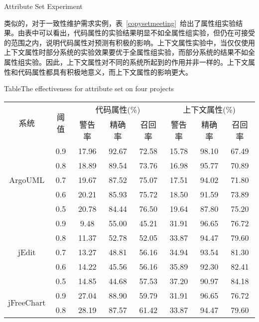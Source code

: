 {Attribute Set Experiment}

类似的，对于一致性维护需求实例，表~\ref{copysetmeeting}~给出了属性组实验结果。由表中可以看出，代码属性的实验结果明显不如全属性组实验，但仍在可接受的范围之内，说明代码属性对预测有积极的影响。上下文属性实验中，当仅仅使用上下文属性时部分系统的实验效果要优于全属性组实验，而部分系统的结果不如全属性组实验。因此，上下文属性对不同的系统所起到的作用并非一样的。上下文属性和代码属性都具有积极地意义，而上下文属性的影响更大。


\begin{table}[htbp]
{Table$\!$}{The effectiveness for attribute set on four projects}
\vspace{0.5em}\centering\wuhao
\begin{tabular}{cccccccc}
\toprule[1.5pt]
\multirow{2}{*}{系统}&\multirow{2}{*}{阈值}&\multicolumn{3}{c}{ 代码属性(\%)}&\multicolumn{3}{c}{上下文属性(\%)}\\
&&{警告率}&{精确率}&{召回率}&{警告率}&{精确率}&{召回率}\\
\midrule[1pt]
\multirow{5}{*}{ArgoUML}
&0.9&	17.96&	92.67&	72.58&	15.78&	98.10&	67.49\\
&0.8&	18.89&	89.54&	73.76&	16.98&	95.77&	70.89\\
&0.7&	19.67&	87.52&	75.07&	17.51&	94.02&	71.80\\
&0.6&	20.21&	85.93&	75.72&	18.50&	91.59&	73.89\\
&0.5&	20.78&	84.44&	76.50&	19.64&	87.80&	75.20\\
\hline
\multirow{5}{*}{jEdit}
&0.9&	9.48&	55.00&	45.21&	31.91&	96.65&	76.72\\
&0.8&	11.37&	52.78&	52.05&	33.87&	94.47&	79.60\\
&0.7&	13.27&	48.81&	56.16&	34.94&	93.54&	81.30\\
&0.6&	14.22&	45.56&	56.16&	35.89&	92.30&	82.41\\
&0.5&	14.85&	44.68&	57.53&	37.20&	90.97&	84.18\\
\hline
\multirow{5}{*}{jFreeChart}
&0.9&	27.04&	88.90&	59.79&	31.91&	96.65&	76.72\\
&0.8&	28.19&	87.57&	61.42&	33.87&	94.47&	79.60\\

\end{tabular}
\end{table}
